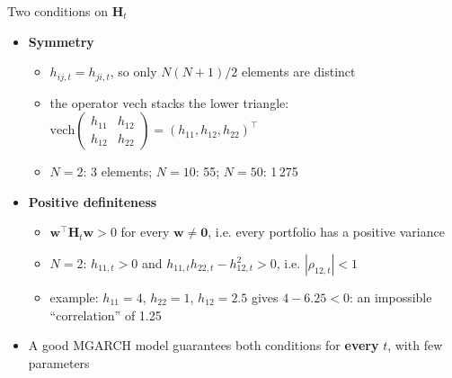 \begin{frame}{Two conditions on $\mathbf{H}_t$}
\itemsize{\small}
\begin{itemize}
    \item \textbf{Symmetry}
    \begin{itemize}
        \item $h_{ij,t} = h_{ji,t}$, so only $N(N+1)/2$ elements are distinct
        \item the operator $\mathrm{vech}$ stacks the lower triangle: $\mathrm{vech}\begin{pmatrix} h_{11} & h_{12}\\ h_{12} & h_{22}\end{pmatrix} = (h_{11}, h_{12}, h_{22})^\top$
        \item $N = 2$: 3 elements; $N = 10$: 55; $N = 50$: 1\,275
    \end{itemize}
    \item \textbf{Positive definiteness}
    \begin{itemize}
        \item $\mathbf{w}^\top\mathbf{H}_t\mathbf{w} > 0$ for every $\mathbf{w} \neq \mathbf{0}$, i.e. every portfolio has a positive variance
        \item $N = 2$: $h_{11,t} > 0$ and $h_{11,t}h_{22,t} - h_{12,t}^2 > 0$, i.e. $|\rho_{12,t}| < 1$
        \item example: $h_{11} = 4$, $h_{22} = 1$, $h_{12} = 2.5$ gives $4 - 6.25 < 0$: an impossible ``correlation'' of 1.25
    \end{itemize}
    \item A good MGARCH model guarantees both conditions for \textbf{every} $t$, with few parameters
\end{itemize}
\end{frame}

